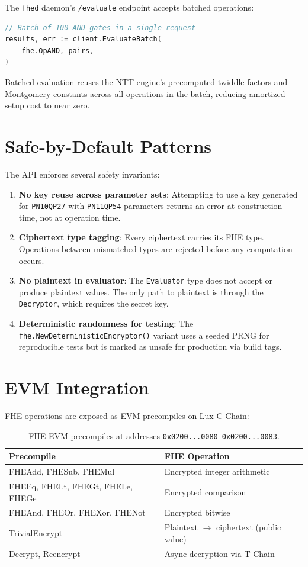 \documentclass[11pt]{article}
\begin{document}
The \texttt{fhed} daemon's \texttt{/evaluate} endpoint accepts batched operations:

\begin{lstlisting}[language=Go]
// Batch of 100 AND gates in a single request
results, err := client.EvaluateBatch(
    fhe.OpAND, pairs,
)
\end{lstlisting}

Batched evaluation reuses the NTT engine's precomputed twiddle factors and Montgomery constants across all operations in the batch, reducing amortized setup cost to near zero.

\section{Safe-by-Default Patterns}

The API enforces several safety invariants:

\begin{enumerate}
\item \textbf{No key reuse across parameter sets}: Attempting to use a key generated for \texttt{PN10QP27} with \texttt{PN11QP54} parameters returns an error at construction time, not at operation time.
\item \textbf{Ciphertext type tagging}: Every ciphertext carries its FHE type. Operations between mismatched types are rejected before any computation occurs.
\item \textbf{No plaintext in evaluator}: The \texttt{Evaluator} type does not accept or produce plaintext values. The only path to plaintext is through the \texttt{Decryptor}, which requires the secret key.
\item \textbf{Deterministic randomness for testing}: The \texttt{fhe.NewDeterministicEncryptor()} variant uses a seeded PRNG for reproducible tests but is marked as unsafe for production via build tags.
\end{enumerate}

\section{EVM Integration}

FHE operations are exposed as EVM precompiles on Lux C-Chain:

\begin{table}[h]
\centering
\small
\begin{tabular}{@{}ll@{}}
\toprule
\textbf{Precompile} & \textbf{FHE Operation} \\
\midrule
FHEAdd, FHESub, FHEMul & Encrypted integer arithmetic \\
FHEEq, FHELt, FHEGt, FHELe, FHEGe & Encrypted comparison \\
FHEAnd, FHEOr, FHEXor, FHENot & Encrypted bitwise \\
TrivialEncrypt & Plaintext $\to$ ciphertext (public value) \\
Decrypt, Reencrypt & Async decryption via T-Chain \\
\bottomrule
\end{tabular}
\caption{FHE EVM precompiles at addresses \texttt{0x0200...0080}--\texttt{0x0200...0083}.}
\label{tab:precompiles}
\end{table}
\end{document}
